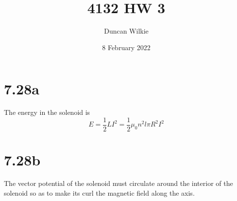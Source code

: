 \documentclass{article}
\title{4132 HW 3}
\author{Duncan Wilkie}
\date{8 February 2022}
\begin{document}
\maketitle

\section*{7.28a}
The energy in the solenoid is
\[E=\frac{1}{2}LI^2=\frac{1}{2}\mu_0n^2l\pi R^2I^2\]
\section*{7.28b}
The vector potential of the solenoid must circulate around the interior of the solenoid so as to make its curl the magnetic field along the axis.
\end{document}
